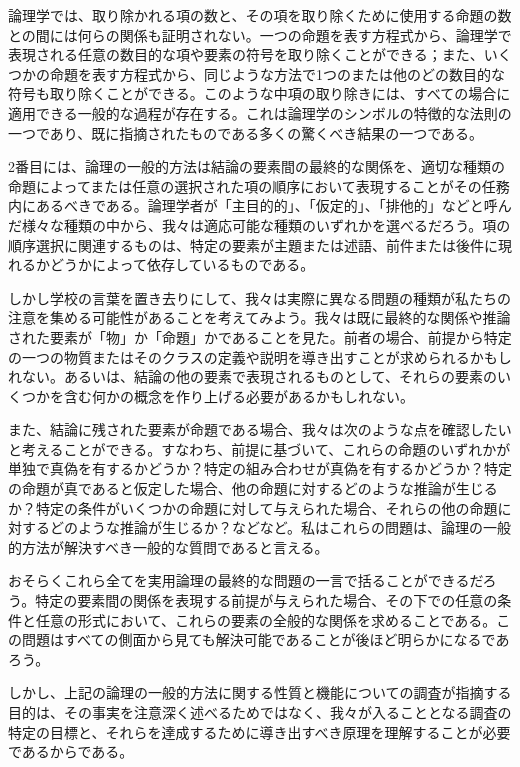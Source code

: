 \documentclass[a4paper,11pt,openany]{ltjsbook}
\begin{document}
論理学では、取り除かれる項の数と、その項を取り除くために使用する命題の数との間には何らの関係も証明されない。一つの命題を表す方程式から、論理学で表現される任意の数目的な項や要素の符号を取り除くことができる；また、いくつかの命題を表す方程式から、同じような方法で1つのまたは他のどの数目的な符号も取り除くことができる。このような中項の取り除きには、すべての場合に適用できる一般的な過程が存在する。これは論理学のシンボルの特徴的な法則の一つであり、既に指摘されたものである多くの驚くべき結果の一つである。

2番目には、論理の一般的方法は結論の要素間の最終的な関係を、適切な種類の命題によってまたは任意の選択された項の順序において表現することがその任務内にあるべきである。論理学者が「主目的的」、「仮定的」、「排他的」などと呼んだ様々な種類の中から、我々は適応可能な種類のいずれかを選べるだろう。項の順序選択に関連するものは、特定の要素が主題または述語、前件または後件に現れるかどうかによって依存しているものである。

しかし学校の言葉を置き去りにして、我々は実際に異なる問題の種類が私たちの注意を集める可能性があることを考えてみよう。我々は既に最終的な関係や推論された要素が「物」か「命題」かであることを見た。前者の場合、前提から特定の一つの物質またはそのクラスの定義や説明を導き出すことが求められるかもしれない。あるいは、結論の他の要素で表現されるものとして、それらの要素のいくつかを含む何かの概念を作り上げる必要があるかもしれない。

また、結論に残された要素が命題である場合、我々は次のような点を確認したいと考えることができる。すなわち、前提に基づいて、これらの命題のいずれかが単独で真偽を有するかどうか？特定の組み合わせが真偽を有するかどうか？特定の命題が真であると仮定した場合、他の命題に対するどのような推論が生じるか？特定の条件がいくつかの命題に対して与えられた場合、それらの他の命題に対するどのような推論が生じるか？などなど。私はこれらの問題は、論理の一般的方法が解決すべき一般的な質問であると言える。

おそらくこれら全てを実用論理の最終的な問題の一言で括ることができるだろう。特定の要素間の関係を表現する前提が与えられた場合、その下での任意の条件と任意の形式において、これらの要素の全般的な関係を求めることである。この問題はすべての側面から見ても解決可能であることが後ほど明らかになるであろう。

しかし、上記の論理の一般的方法に関する性質と機能についての調査が指摘する目的は、その事実を注意深く述べるためではなく、我々が入ることとなる調査の特定の目標と、それらを達成するために導き出すべき原理を理解することが必要であるからである。
\end{document}
